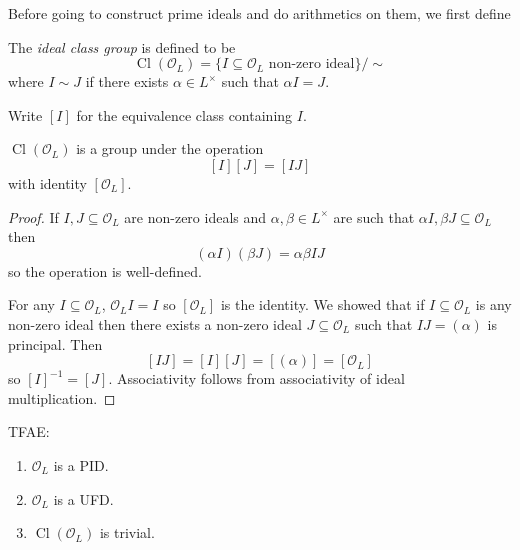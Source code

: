 \documentclass[a4paper]{article}
\renewcommand*{\O}{\mathcal{O}}
\DeclareMathOperator{\Cl}{Cl}%
\begin{document}
Before going to construct prime ideals and do arithmetics on them, we first define

\begin{definition}
  The \emph{ideal class group} is defined to be
  \[
    \Cl(\O_L) = \{I \subseteq \O_L \text{ non-zero ideal}\}/\sim
  \]
  where \(I \sim J\) if there exists \(\alpha \in L^\times\) such that \(\alpha I = J\).

  Write \([I]\) for the equivalence class containing \(I\).
\end{definition}

\begin{lemma}
  \(\Cl(\O_L)\) is a group under the operation
  \[
    [I][J] = [IJ]
  \]
  with identity \([\O_L]\).
\end{lemma}

\begin{proof}
  If \(I, J \subseteq \O_L\) are non-zero ideals and \(\alpha, \beta \in L^\times\) are such that \(\alpha I, \beta J \subseteq \O_L\) then
  \[
    (\alpha I)(\beta J) = \alpha\beta IJ
  \]
  so the operation is well-defined.

  For any \(I \subseteq \O_L\), \(\O_L I = I\) so \([\O_L]\) is the identity. We showed that if \(I \subseteq \O_L\) is any non-zero ideal then there exists a non-zero ideal \(J \subseteq \O_L\) such that \(IJ = (\alpha)\) is principal. Then
  \[
    [IJ] = [I][J] = [(\alpha)] = [\O_L]
  \]
  so \([I]^{-1} = [J]\). Associativity follows from associativity of ideal multiplication.
\end{proof}

\begin{proposition}
  TFAE:
  \begin{enumerate}
  \item \(\O_L\) is a PID.
  \item \(\O_L\) is a UFD.
  \item \(\Cl(\O_L)\) is trivial.
  \end{enumerate}
\end{proposition}
\end{document}
